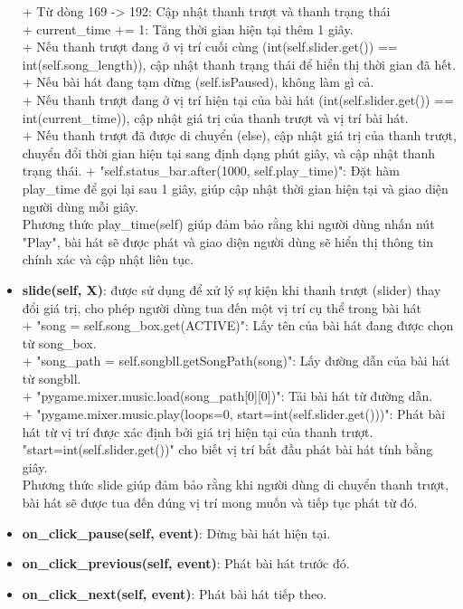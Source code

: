 \documentclass[a4paper]{article}
\begin{document}
\begin{itemize}
    + Từ dòng 169 -> 192: Cập nhật thanh trượt và thanh trạng thái \\
    + current\_time += 1: Tăng thời gian hiện tại thêm 1 giây. \\
    + Nếu thanh trượt đang ở vị trí cuối cùng (int(self.slider.get()) == int(self.song\_length)), cập nhật thanh trạng thái để hiển thị thời gian đã hết. \\
    + Nếu bài hát đang tạm dừng (self.isPaused), không làm gì cả. \\
    + Nếu thanh trượt đang ở vị trí hiện tại của bài hát (int(self.slider.get()) == int(current\_time)), cập nhật giá trị của thanh trượt và vị trí bài hát. \\
    + Nếu thanh trượt đã được di chuyển (else), cập nhật giá trị của thanh trượt, chuyển đổi thời gian hiện tại sang định dạng phút giây, và cập nhật thanh trạng thái.
    + "self.status\_bar.after(1000, self.play\_time)": Đặt hàm play\_time để gọi lại sau 1 giây, giúp cập nhật thời gian hiện tại và giao diện người dùng mỗi giây. \\
    Phương thức play\_time(self) giúp đảm bảo rằng khi người dùng nhấn nút "Play", bài hát sẽ được phát và giao diện người dùng sẽ hiển thị thông tin chính xác và cập nhật liên tục.
    \item \textbf{slide(self, X)}: được sử dụng để xử lý sự kiện khi thanh trượt (slider) thay đổi giá trị, cho phép người dùng tua đến một vị trí cụ thể trong bài hát\\
    + "song = self.song\_box.get(ACTIVE)": Lấy tên của bài hát đang được chọn từ song\_box. \\
    + "song\_path = self.songbll.getSongPath(song)": Lấy đường dẫn của bài hát từ songbll. \\
    + "pygame.mixer.music.load(song\_path[0][0])": Tải bài hát từ đường dẫn. \\
    + "pygame.mixer.music.play(loops=0, start=int(self.slider.get()))": Phát bài hát từ vị trí được xác định bởi giá trị hiện tại của thanh trượt. "start=int(self.slider.get())" cho biết vị trí bắt đầu phát bài hát tính bằng giây. \\
    Phương thức slide giúp đảm bảo rằng khi người dùng di chuyển thanh trượt, bài hát sẽ được tua đến đúng vị trí mong muốn và tiếp tục phát từ đó.
    \item \textbf{on\_click\_pause(self, event)}: Dừng bài hát hiện tại.
    \item \textbf{on\_click\_previous(self, event)}: Phát bài hát trước đó.
    \item \textbf{on\_click\_next(self, event)}: Phát bài hát tiếp theo.
\end{itemize}
\end{document}
